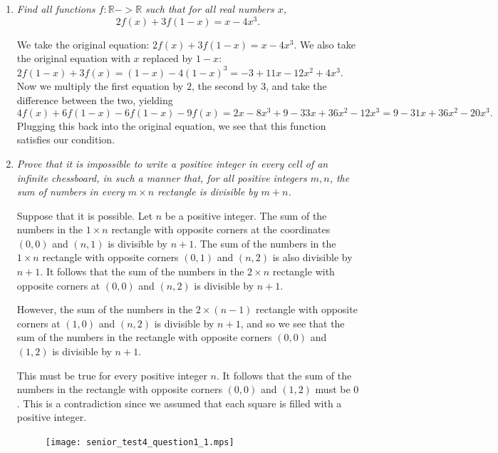 \documentclass{article}
\begin{document}
\begin{enumerate}[1.]
\vspace{6pt}
\item %
\textit{Find all functions $f : \mathbb{R} -> \mathbb{R}$ such that for all real numbers $x$, \[ 2 f(x) +3 f(1-x) = x-4x^3. \]}

We take the original equation: $2 f(x) +3 f(1-x) = x-4x^3$. We also take the original equation with $x$ replaced by $1-x$: $2 f(1-x) +3 f(x) = (1-x) -4(1-x)^3 = -3 +11x -12x^2 +4x^3$. Now we multiply the first equation by $2$, the second by $3$, and take the difference between the two, yielding \[ 4 f(x) +6f(1-x) -6 f(1-x) -9 f(x) = 2x -8x^3 +9 -33x +36x^2 -12x^3 = 9 -31x +36x^2 -20x^3. \]
Plugging this back into the original equation, we see that this function satisfies our condition.


\vspace{6pt}
\item %
\textit{Prove that it is impossible to write a positive integer in every cell of an infinite chessboard, in such a manner that, for all positive integers $m, n$, the sum of numbers in every $m\times n$ rectangle is divisible by $m + n$.}

Suppose that it is possible. Let $n$ be a positive integer. The sum of the numbers in the $1 \times n$ rectangle with opposite corners at the coordinates $(0, 0)$ and $(n, 1)$ is divisible by $n + 1$. The sum of the numbers in the $1 \times n$ rectangle with opposite corners $(0, 1)$ and $(n, 2)$ is also divisible by $n + 1$. It follows that the sum of the numbers in the $2 \times n$ rectangle with opposite corners at $(0, 0)$ and $(n, 2)$ is divisible by $n + 1$.

However, the sum of the numbers in the $2 \times (n - 1)$ rectangle with opposite corners at $(1, 0)$ and $(n, 2)$ is divisible by $n + 1$, and so we see that the sum of the numbers in the rectangle with opposite corners $(0, 0)$ and $(1, 2)$ is divisible by $n + 1$.

This must be true for every positive integer $n$. It follows that the sum of the numbers in the rectangle with opposite corners $(0, 0)$ and $(1, 2)$ must be $0$. This is a contradiction since we assumed that each square is filled with a positive integer.

\begin{figure}[H]
\centering
\texttt{[image: senior\_test4\_question1\_1.mps]}
\end{figure}



\end{enumerate}
\end{document}
